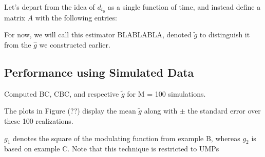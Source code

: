 \documentclass{article}
\newcommand{\define}{\ensuremath \stackrel{\text{def}}{=}}
\begin{document}
Let's depart from the idea of $d_{t_0}$ as a single function of time, and instead define a matrix $A$ with the following entries:
For now, we will call this estimator BLABLABLA, denoted $\tilde g$ to distinguish it from the $\hat g$ we constructed earlier.

\subsection{Performance using Simulated Data}

Computed BC, CBC, and respective $\tilde g$ for M = 100 simulations. 

The plots in Figure (??) display the mean $\tilde g$ along with $\pm$ the standard error over these 100 realizations.

$g_1$ denotes the square of the modulating function from example B, whereas $g_2$ is based on example C. 
Note that this technique is restricted to UMPs
\end{document}
